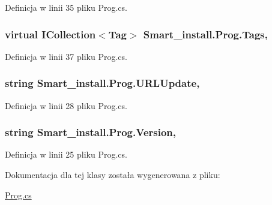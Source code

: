 Definicja w linii 35 pliku Prog.\+cs.

\hypertarget{class_smart__install_1_1_prog_ad3c781481868df3852768412c40490d5}{
\subsubsection[{Tags}]{\setlength{\rightskip}{0pt plus 5cm}virtual I\+Collection$<${\bf Tag}$>$ Smart\+\_\+install.\+Prog.\+Tags\hspace{0.3cm}{\ttfamily [get]}, {\ttfamily [set]}}}\label{class_smart__install_1_1_prog_ad3c781481868df3852768412c40490d5}


Definicja w linii 37 pliku Prog.\+cs.

\hypertarget{class_smart__install_1_1_prog_adbdecfb233f4747de164aa713e0eb9b9}{
\subsubsection[{U\+R\+L\+Update}]{\setlength{\rightskip}{0pt plus 5cm}string Smart\+\_\+install.\+Prog.\+U\+R\+L\+Update\hspace{0.3cm}{\ttfamily [get]}, {\ttfamily [set]}}}\label{class_smart__install_1_1_prog_adbdecfb233f4747de164aa713e0eb9b9}


Definicja w linii 28 pliku Prog.\+cs.

\hypertarget{class_smart__install_1_1_prog_afe5824034eb128c9cbf4070662d9bfc5}{
\subsubsection[{Version}]{\setlength{\rightskip}{0pt plus 5cm}string Smart\+\_\+install.\+Prog.\+Version\hspace{0.3cm}{\ttfamily [get]}, {\ttfamily [set]}}}\label{class_smart__install_1_1_prog_afe5824034eb128c9cbf4070662d9bfc5}


Definicja w linii 25 pliku Prog.\+cs.



Dokumentacja dla tej klasy została wygenerowana z pliku\+:\begin{DoxyCompactItemize}
\item 
\hyperlink{_prog_8cs}{Prog.\+cs}\end{DoxyCompactItemize}
